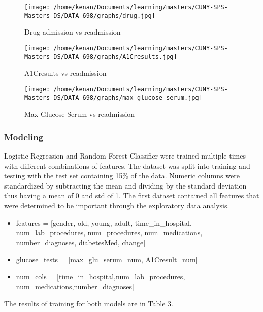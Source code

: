 \documentclass[5p]{elsarticle} %
\providecommand{\tightlist}{%
  \setlength{\itemsep}{0pt}\setlength{\parskip}{0pt}}
\begin{document}
\begin{figure}
\hypertarget{id}{%
\centering
\texttt{[image: /home/kenan/Documents/learning/masters/CUNY-SPS-Masters-DS/DATA\_698/graphs/drug.jpg]}
\caption{Drug admission vs readmission}\label{id}
}
\end{figure}

\begin{figure}
\hypertarget{id}{%
\centering
\texttt{[image: /home/kenan/Documents/learning/masters/CUNY-SPS-Masters-DS/DATA\_698/graphs/A1Cresults.jpg]}
\caption{A1Cresults vs readmission}\label{id}
}
\end{figure}

\begin{figure}
\hypertarget{id}{%
\centering
\texttt{[image: /home/kenan/Documents/learning/masters/CUNY-SPS-Masters-DS/DATA\_698/graphs/max\_glucose\_serum.jpg]}
\caption{Max Glucose Serum vs readmission}\label{id}
}
\end{figure}

\clearpage
\twocolumn

\hypertarget{modeling}{%
\subsubsection{Modeling}\label{modeling}}

Logistic Regression and Random Forest Classifier were trained multiple
times with different combinations of features. The dataset was split
into training and testing with the test set containing 15\% of the data.
Numeric columns were standardized by subtracting the mean and dividing
by the standard deviation thus having a mean of 0 and std of 1. The
first dataset contained all features that were determined to be
important through the exploratory data analysis.

\begin{itemize}
\tightlist
\item
  features = {[}gender, old, young, adult, time\_in\_hospital,
  num\_lab\_procedures, num\_procedures, num\_medications,
  number\_diagnoses, diabetesMed, change{]}
\item
  glucose\_tests = {[}max\_glu\_serum\_num, A1Cresult\_num{]}
\item
  num\_cols = {[}time\_in\_hospital,num\_lab\_procedures,
  num\_medications,number\_diagnoses{]}
\end{itemize}

The results of training for both models are in Table 3.
\end{document}

